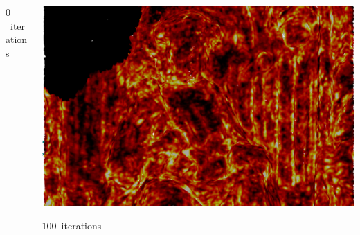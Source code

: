 \documentclass[aspectratio=169,t]{beamer}
\begin{document}
{\begin{columns}
\begin{column}{0.33\textwidth}
			{\footnotesize 
				\par \vspace{-1mm} $0$~iterations
			}
		\end{column}
		\begin{column}{0.33\textwidth}
			\centering
			\includegraphics[width=\textwidth]{data/acquired_meshes/unisiegel_100iter.png}
			{\footnotesize
				\par \vspace{-1mm} $100$~iterations
			}
		\end{column}
	\end{columns}
}
\end{document}
